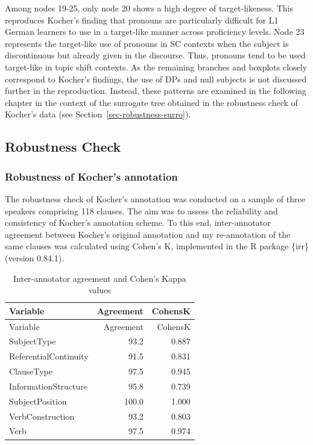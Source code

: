 \documentclass[
  letterpaper,
  DIV=11,
  numbers=noendperiod]{scrartcl}
\begin{document}
Among nodes 19-25, only node 20 shows a high degree of target-likeness.
This reproduces Kocher's finding that pronouns are particularly
difficult for L1 German learners to use in a target-like manner across
proficiency levels. Node 23 represents the target-like use of pronouns
in SC contexts when the subject is discontinuous but already given in
the discourse. Thus, pronouns tend to be used target-like in topic shift
contexts. As the remaining branches and boxplots closely correspond to
Kocher's findings, the use of DPs and null subjects is not discussed
further in the reproduction. Instead, these patterns are examined in the
following chapter in the context of the surrogate tree obtained in the
robustness check of Kocher's data (see
Section~\ref{sec-robustness-surro}).

\subsection{Robustness Check}\label{sec-RobustnessCheck}

\subsubsection{Robustness of Kocher's
annotation}\label{sec-RobustnessAnnotation}

The robustness check of Kocher's annotation was conducted on a sample of
three speakers comprising 118 clauses. The aim was to assess the
reliability and consistency of Kocher's annotation scheme. To this end,
inter-annotator agreement between Kocher's original annotation and my
re-annotation of the same clauses was calculated using Cohen's K,
implemented in the R package \{irr\} (version 0.84.1).

\begin{longtable}[]{@{}lrr@{}}
\caption{Inter-annotator agreement and Cohen's Kappa
values}\tabularnewline
\toprule\noalign{}
Variable & Agreement & CohensK \\
\midrule\noalign{}
\endfirsthead
\toprule\noalign{}
Variable & Agreement & CohensK \\
\midrule\noalign{}
\endhead
\bottomrule\noalign{}
\endlastfoot
SubjectType & 93.2 & 0.887 \\
ReferentialContinuity & 91.5 & 0.831 \\
ClauseType & 97.5 & 0.945 \\
InformationStructure & 95.8 & 0.739 \\
SubjectPosition & 100.0 & 1.000 \\
VerbConstruction & 93.2 & 0.803 \\
Verb & 97.5 & 0.974 \\
\end{longtable}
\end{document}
